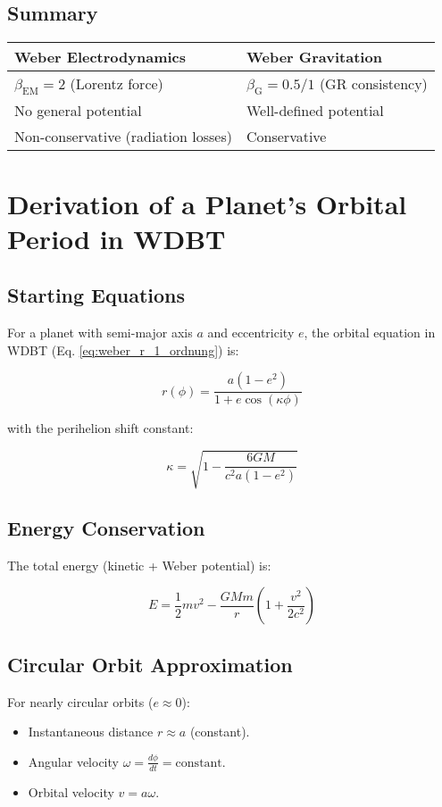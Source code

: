 \subsection*{Summary}
\begin{tabular}{ll}
\textbf{Weber Electrodynamics} & \textbf{Weber Gravitation} \\ \hline
$\beta_{\text{EM}} = 2$ (Lorentz force) & $\beta_{\text{G}} = 0.5/1$ (GR consistency) \\
No general potential & Well-defined potential \\
Non-conservative (radiation losses) & Conservative \\
\end{tabular}

\section{Derivation of a Planet's Orbital Period in WDBT}
\label{sec:orbital_period}

\subsection*{Starting Equations}
For a planet with semi-major axis \( a \) and eccentricity \( e \), the orbital equation in WDBT (Eq. \ref{eq:weber_r_1_ordnung}) is:

\begin{equation}
r(\phi) = \frac{a(1-e^2)}{1 + e \cos(\kappa \phi)}
\end{equation}

with the perihelion shift constant:

\begin{equation}
\kappa = \sqrt{1 - \frac{6GM}{c^2 a(1-e^2)}}
\end{equation}

\subsection*{Energy Conservation}
The total energy (kinetic + Weber potential) is:

\begin{equation}
E = \frac{1}{2}mv^2 - \frac{GMm}{r}\left(1 + \frac{v^2}{2c^2}\right)
\end{equation}

\subsection*{Circular Orbit Approximation}
For nearly circular orbits (\( e \approx 0 \)):
\begin{itemize}
\item Instantaneous distance \( r \approx a \) (constant).
\item Angular velocity \( \omega = \frac{d\phi}{dt} = \text{constant} \).
\item Orbital velocity \( v = a\omega \).
\end{itemize}

